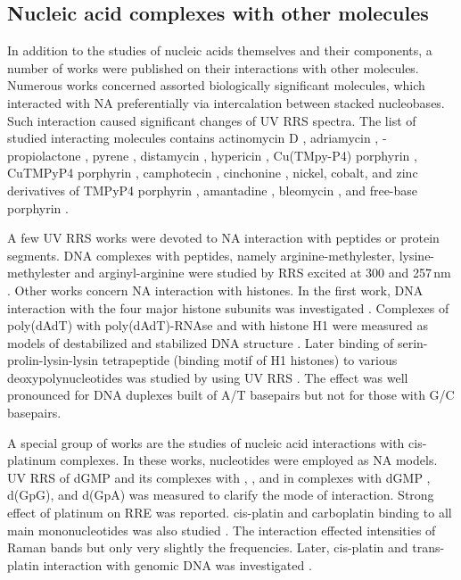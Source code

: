 \subsection{Nucleic acid complexes with other molecules}

In addition to the studies of nucleic acids themselves and their components, a
number of works were published on their interactions with other molecules.
Numerous works concerned assorted biologically significant molecules, which
interacted with NA preferentially via intercalation between stacked
nucleobases.
Such interaction caused significant changes of UV RRS spectra.
The list of studied interacting molecules contains actinomycin D
\parencite{Chinsky1978},
adriamycin
\parencite{Manfait1982},
-propiolactone
\parencite{Jolles1988},
pyrene
\parencite{Jones1988},
distamycin
\parencite{Grygon1989},
hypericin
\parencite{Miskovsky1995},
Cu(TMpy-P4) porphyrin
\parencite{Tomkova1995},
CuTMPyP4 porphyrin
\parencite{Wheeler1995},
camphotecin
\parencite{Feofanov1996},
cinchonine
\parencite{Weselucha-Birczynska1996},
nickel, cobalt, and zinc derivatives of TMPyP4 porphyrin
\parencite{Wheeler1997},
amantadine
\parencite{Stanicova1999},
bleomycin
\parencite{Weselucha-Birczynska2000},
and free-base  porphyrin
\parencite{Wei2006}.

A few UV RRS works were devoted to NA interaction with peptides or protein
segments.
DNA complexes with peptides, namely arginine-methylester, lysine-methylester
and arginyl-arginine were studied by RRS excited at 300 and 257\,nm
\parencite{Laigle1982a}.
Other works concern NA interaction with histones.
In the first work, DNA interaction with the four major histone subunits was
investigated
\parencite{Laigle1982b}.
Complexes of poly(dAdT) with poly(dAdT)-RNAse and with histone H1 were measured
as models of destabilized and stabilized DNA structure
\parencite{Chinsky1982a}.
Later binding of serin-prolin-lysin-lysin tetrapeptide (binding motif of H1
histones) to various deoxypolynucleotides was studied by using UV RRS
\parencite{Takeuchi1995}.
The effect was well pronounced for DNA duplexes built of A/T basepairs but not
for those with G/C basepairs.

A special group of works are the studies of nucleic acid interactions with
cis-platinum complexes.
In these works, nucleotides were employed as NA models.
UV RRS of dGMP and its complexes with , , and
 in complexes with dGMP
\parencite{Perno1987},
d(GpG), and d(GpA)
\parencite{Perno1988}
was measured to clarify the mode of interaction.
Strong effect of platinum on RRE was reported.
cis-platin and carboplatin binding to all main mononucleotides was also studied
\parencite{%
	Benson1992,%
	Benson1993%
}.
The interaction effected intensities of Raman bands but only very slightly the
frequencies.
Later, cis-platin and trans-platin interaction with genomic DNA was
investigated
\parencite{Geng2017}.
